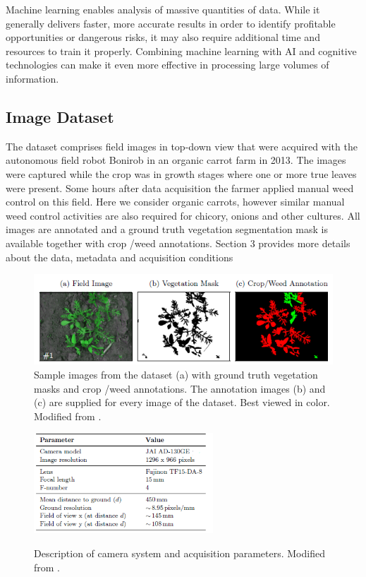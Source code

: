 \documentclass[12pt]{article}
\numberwithin{equation}{section}
\numberwithin{table}{section}
\numberwithin{figure}{section}
\begin{document}
Machine learning enables analysis of massive quantities of data. While it generally delivers faster, more accurate results in order to identify profitable opportunities or dangerous risks, it may also require additional time and resources to train it properly. Combining machine learning with AI and cognitive technologies can make it even more effective in processing large volumes of information.


\subsection{Image Dataset}

The dataset comprises field images in top-down view that were acquired with the autonomous field robot Bonirob in an organic carrot farm in 2013. The images were captured while the crop was in growth stages where one
or more true leaves were present. Some hours after data acquisition the farmer applied manual weed control on this field. Here we consider organic carrots, however similar manual weed control activities are also required for chicory, onions and other cultures. All images are annotated and a ground truth vegetation segmentation mask is available together with crop /weed annotations. Section 3 provides more details about the data, metadata and acquisition conditions


\begin{figure}[H] \centering
	\includegraphics[width=1\textwidth]{image1.png}
	\caption{Sample images from the dataset (a) with ground truth vegetation masks
		and crop /weed annotations. The annotation images (b) and (c) are supplied for
		every image of the dataset. Best viewed in color. Modified from \cite{Haug2015}. }
	\label{figure1}
\end{figure}


\begin{figure}[H] \centering
	\caption{Description of camera system and acquisition parameters. Modified from \cite{Haug2015}. }
	\includegraphics[width=0.6\textwidth]{image2.png}
	\label{figure2}
\end{figure}
\end{document}

